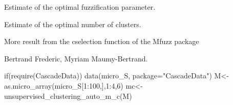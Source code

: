 \documentclass[a4paper]{book}
\begin{document}
%
\begin{Value}
\begin{ldescription}
\item[\code{m}] Estimate of the optimal fuzzification parameter.
\item[\code{c}] Estimate of the optimal number of clusters.
\item[\code{csearch}] More result from the cselection function of the Mfuzz package
\end{ldescription}
\end{Value}
%
\begin{Author}\relax
Bertrand Frederic, Myriam Maumy-Bertrand.
\end{Author}
%
\begin{Examples}
\begin{ExampleCode}
if(require(CascadeData)){
data(micro_S, package="CascadeData")
M<-as.micro_array(micro_S[1:100,],1:4,6)
mc<-unsupervised_clustering_auto_m_c(M)
}
\end{ExampleCode}
\end{Examples}
\printindex{}
\end{document}
